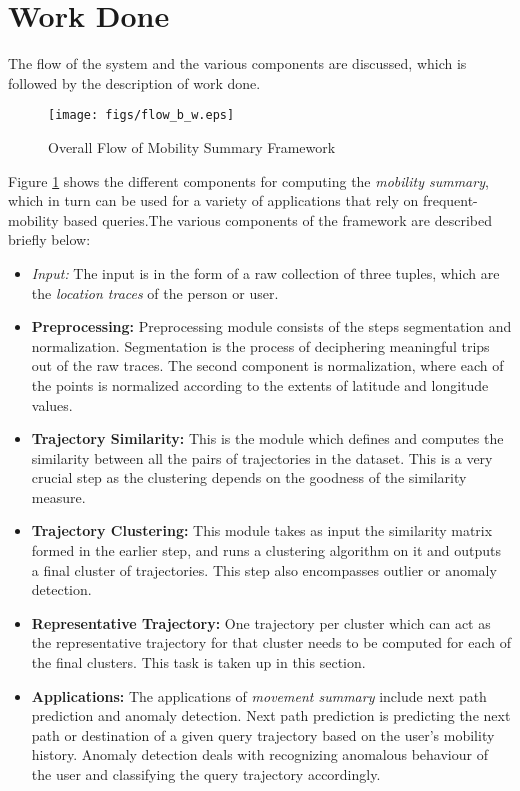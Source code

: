 \section{Work Done}
The flow of the system and the various components are discussed, which is followed by the description of work done. 
\begin{figure}[!htb]
\centering
\texttt{[image: figs/flow\_b\_w.eps]}
\caption{Overall Flow of Mobility Summary Framework}
\label{fig:components}
\end{figure}

Figure \ref{fig:components} shows the different components for computing the \emph{mobility summary}, which in turn can be used for a variety of applications that rely on frequent-mobility based queries.The various components of the framework are described briefly below: 

\begin{itemize}
\item{\emph{Input:}}
The input is in the form of a raw collection of three tuples, which are the \emph{location traces} of the person or user.
\item{\textbf{Preprocessing:}} 
Preprocessing module consists of the steps segmentation and normalization. Segmentation is the process of deciphering meaningful trips out of the raw traces. The second component is normalization, where each of the points is normalized according to the extents of latitude and longitude values.
\item{\textbf{Trajectory Similarity:}}
This is the module which defines and computes the similarity between all the pairs of trajectories in the dataset. This is a very crucial step as the clustering depends on the goodness of the similarity measure.
\item{\textbf{Trajectory Clustering:}} 
This module takes as input the similarity matrix formed in the earlier step, and runs a clustering algorithm on it and outputs a final cluster of trajectories. This step also encompasses outlier or anomaly detection.
\item{\textbf{Representative Trajectory:}} 
One trajectory per cluster which can act as the representative trajectory for that cluster needs to be computed for each of the final clusters. This task is taken up in this section.
\item{\textbf{Applications:}}
The applications of \emph{movement summary} include next path prediction and anomaly detection. Next path prediction is predicting the next path or destination of a given query trajectory based on the user's mobility history. Anomaly detection deals with recognizing anomalous behaviour of the user and classifying the query trajectory accordingly.
\end{itemize}

